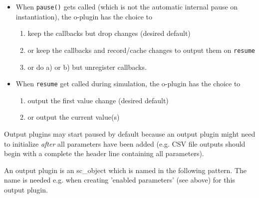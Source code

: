 \begin{itemize}
  \item When \lstinline|pause()| gets called (which is not the automatic internal pause on instantiation), the o-plugin has the choice to
    \begin{enumerate}
          \item keep the callbacks but drop changes (desired default)
          \item or keep the callbacks and record/cache changes to output them on \lstinline|resume|
          \item or do a) or b) but unregister callbacks.
    \end{enumerate}
  \item When \lstinline|resume| get called during simulation, the o-plugin has the choice to
    \begin{enumerate}
          \item output the first value change (desired default)
          \item or output the current value(s)
    \end{enumerate}
\end{itemize}


 Output plugins may start paused by default because an output plugin might need to initialize \textsl{after} all parameters have been added (e.g. CSV file outputs should begin with a complete the header line containing all parameters).


\let\theenumi=\oldtheenumi
\let\labelenumi=\oldlabelenumi


An output plugin is an {\sffamily sc\_object} which is named in the following pattern. The name is needed e.g. when creating 'enabled parameters' (see above) for this output plugin.

